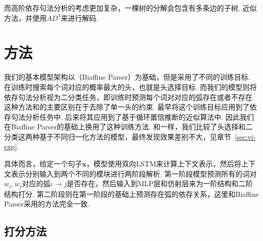 而高阶依存句法分析的考虑更加复杂，一棵树的分解会包含有多条边的子树.
近似方法\cite{smith-eisner-2008-dependency,gormley-etal-2015-approximation}，并使用$AD^3$\cite{martins-etal-2011-dual,martins-etal-2013-turning}来进行解码.

\section{方法}\label{sec:vi-approach}

我们的基本模型架构以\cite{dozat-etal-2017-biaffine}（Biaffine Parser）为基础，但是采用了不同的训练目标.
\cite{dozat-etal-2017-biaffine}在训练时搜索每个词对应的概率最大的头，也就是头选择目标\cite{zhang-etal-2017-head}.
而我们的模型则将依存句法分析视为二分类任务，即训练时预测每个词对对应的弧存在或者不存在.
这种方法和\cite{dozat-etal-2017-biaffine}的主要区别在于去除了单一头的约束.
\cite{eisner-1996-three}最早将这个训练目标应用到了依存句法分析任务中.
\cite{smith-eisner-2008-dependency}后来将其应用到了基于循环置信推断的近似算法中.
因此我们在Biaffine Parser的基础上换用了这种训练方法.
和\cite{zhang-etal-2019-empirical}一样，我们比较了头选择和二分类这两种基于不同归一化方法的模型，最终发现效果差别不大，见章节~\ref{sec:vi-exp}.

具体而言，给定一个句子$\boldsymbol{x}$，模型使用双向LSTM来计算上下文表示，然后将上下文表示分别输入到两个不同的模块进行两阶段解析.
第一阶段模型预测所有的词对$w_i,w_j$对应的弧$i\rightarrow j$是否存在，然后输入到MLP层和仿射层来为一阶结构和二阶结构打分.
第二阶段则在第一阶段的基础上预测存在弧的依存关系，这里和Biaffine Parser采用的方法完全一致.

\subsection{打分方法}

